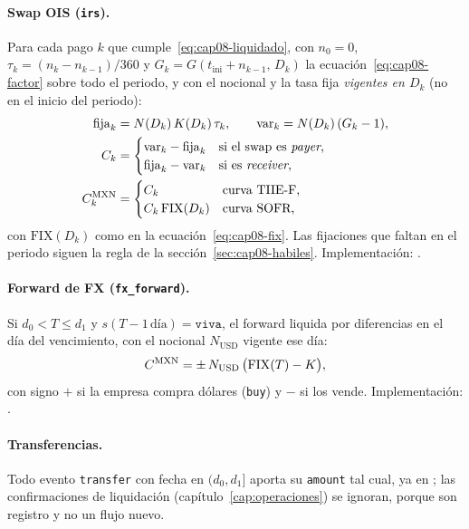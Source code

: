 \paragraph{Swap OIS (\texttt{irs}).} Para cada pago $k$ que cumple~\eqref{eq:cap08-liquidado}, con $n_0 = 0$, $\tau_k = (n_k - n_{k-1})/360$ y $G_k = G(t_{\mathrm{ini}} + n_{k-1},\, D_k)$ la ecuación~\eqref{eq:cap08-factor} sobre todo el periodo, y con el nocional y la tasa fija \emph{vigentes en $D_k$} (no en el inicio del periodo):
\begin{align}
  \mathrm{fija}_k &= N(D_k)\,K(D_k)\,\tau_k, \qquad
  \mathrm{var}_k = N(D_k)\,(G_k - 1), \label{eq:cap08-cupon-patas}\\
  C_k &=
  \begin{cases}
    \mathrm{var}_k - \mathrm{fija}_k & \text{si el swap es \emph{payer},}\\
    \mathrm{fija}_k - \mathrm{var}_k & \text{si es \emph{receiver},}
  \end{cases} \label{eq:cap08-cupon}\\
  C_k^{\textup{MXN}} &=
  \begin{cases}
    C_k & \text{curva TIIE-F,}\\
    C_k\,\mathrm{FIX}(D_k) & \text{curva SOFR,}
  \end{cases} \label{eq:cap08-cupon-mxn}
\end{align}
con $\mathrm{FIX}(D_k)$ como en la ecuación~\eqref{eq:cap08-fix}. Las fijaciones que faltan en el periodo siguen la regla de la sección~\ref{sec:cap08-habiles}. Implementación: .

\paragraph{Forward de FX (\texttt{fx\_forward}).} Si $d_0 < T \le d_1$ y $s(T - 1\,\text{día}) = \texttt{viva}$, el forward liquida por diferencias en \MXN el día del vencimiento, con el nocional $N_{\mathrm{USD}}$ vigente ese día:
\begin{equation}\label{eq:cap08-forward}
  C^{\textup{MXN}} = \pm\,N_{\mathrm{USD}}\,\bigl(\mathrm{FIX}(T) - K\bigr),
\end{equation}
con signo $+$ si la empresa compra dólares (\texttt{buy}) y $-$ si los vende. Implementación: .

\paragraph{Transferencias.} Todo evento \texttt{transfer} con fecha en $(d_0, d_1]$ aporta su \texttt{amount} tal cual, ya en \MXN; las confirmaciones de liquidación (capítulo~\ref{cap:operaciones}) se ignoran, porque son registro y no un flujo nuevo.

